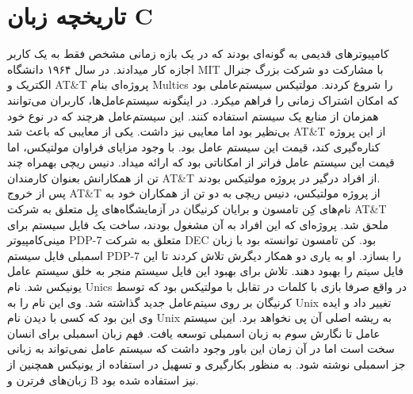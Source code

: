 \chapter{تاریخچه زبان C}
کامپیوترهای قدیمی به گونه‌ای بودند که در یک بازه زمانی مشخص فقط به یک کاربر اجازه کار میدادند. در سال ۱۹۶۴ دانشگاه MIT با مشارکت دو شرکت بزرگ جنرال الکتریک و AT\&T پروژه‌ای بنام Multics را شروع کردند. مولتیکس سیستم‌عاملی بود که امکان اشتراک زمانی را فراهم میکرد. در اینگونه سیستم‌عامل‌ها، کاربران می‌توانند همزمان از منابع یک سیستم استفاده کنند. این سیستم‌عامل هرچند که در نوع خود بی‌نظیر بود اما معایبی نیز داشت. یکی از معایبی که باعث شد AT\&T از این پروژه کناره‌گیری کند، قیمت این سیستم عامل بود. با وجود مزایای فراوان مولتیکس، اما قیمت این سیستم عامل فراتر از امکاناتی بود که ارائه میداد. دنیس ریچی بهمراه چند تن از همکارانش بعنوان کارمندان AT\&T از افراد درگیر در پروژه مولتیکس بودند.\\پس از خروج AT\&T از پروژه مولتیکس،‌ دنیس ریچی به دو تن از همکاران خود به نام‌های کِن تامسون و برایان کرنیگان در آزمایشگاه‌های بِل متعلق به شرکت AT\&T ملحق شد. پروژه‌ای که این افراد به آن مشغول بودند، ساخت یک فایل سیستم  برای مینی‌کامپیوتر PDP-7 متعلق به شرکت DEC بود. کن تامسون توانسته بود با زبان اسمبلی فایل سیستم PDP-7 را بسازد. او به یاری دو همکار دیگرش تلاش کردند تا این فایل سیتم را بهبود دهند. تلاش برای بهبود این فایل سیستم منجر به خلق سیستم عامل یونیکس شد. نام Unics در واقع صرفا بازی با کلمات در تقابل با مولتیکس بود که توسط کرنیگان بر روی سیتم‌عامل جدید گذاشته شد. وی این نام را به Unix تغییر داد و ایده وی این بود که کسی با دیدن نام Unix به ریشه اصلی آن پی نخواهد برد. این سیستم عامل تا نگارش سوم به زبان اسمبلی توسعه یافت. فهم زبان اسمبلی برای انسان سخت است اما در آن زمان این باور وجود داشت که سیستم عامل نمی‌تواند به زبانی جز اسمبلی نوشته شود. به منظور بکارگیری و تسهیل در استفاده از یونیکس همچنین از زبان‌های فرترن و B نیز استفاده شده بود.

